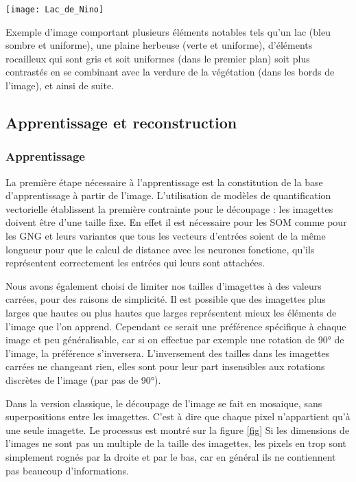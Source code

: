 	\begin{figureth}
		\texttt{[image: Lac\_de\_Nino]}
		\caption[Lac de Nino]{Exemple d'image comportant plusieurs éléments notables tels qu'un lac (bleu sombre et uniforme), une plaine herbeuse (verte et uniforme), d'éléments rocailleux qui sont gris et soit uniformes (dans le premier plan) soit plus contrastés en se combinant avec la verdure de la végétation (dans les bords de l'image), et ainsi de suite.}\label{fig:img:nino}
	\end{figureth}

	\subsection{Apprentissage et reconstruction}\label{sec:img:compression}
	\subsubsection{Apprentissage}
	La première étape nécessaire à l'apprentissage est la constitution de la base d'apprentissage à partir de l'image. L'utilisation de modèles de quantification vectorielle établissent la première contrainte pour le découpage : les imagettes doivent être d'une taille fixe. En effet il est nécessaire pour les SOM comme pour les GNG et leurs variantes que tous les vecteurs d'entrées soient de la même longueur pour que le calcul de distance avec les neurones fonctione, qu'ils représentent correctement les entrées qui leurs sont attachées.

	Nous avons également choisi de limiter nos tailles d'imagettes à des valeurs carrées, pour des raisons de simplicité. Il est possible que des imagettes plus larges que hautes ou plus hautes que larges représentent mieux les éléments de l'image que l'on apprend. Cependant ce serait une préférence spécifique à chaque image et peu généralisable, car si on effectue par exemple une rotation de 90° de l'image, la préférence s'inversera. L'inversement des tailles dans les imagettes carrées ne changeant rien, elles sont pour leur part insensibles aux rotations discrètes de l'image (par pas de 90°).

	Dans la version classique, le découpage de l'image se fait en mosaique, sans superpositions entre les imagettes. C'est à dire que chaque pixel n'appartient qu'à une seule imagette. Le processus est montré sur la figure \ref{fig} Si les dimensions de l'images ne sont pas un multiple de la taille des imagettes, les pixels en trop sont simplement rognés par la droite et par le bas, car en général ils ne contiennent pas beaucoup d'informations.

